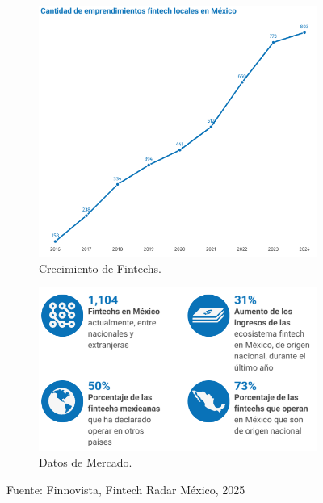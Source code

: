 \begin{figure}[h!]
    \centering
    \begin{subfigure}[b]{0.45\textwidth} %
        \centering
        \includegraphics[scale=0.5]{Figuras/crecimientofintec.png} %
        \caption{Crecimiento de Fintechs.}
        \label{fig:crecfintechs}
    \end{subfigure}
    \hspace{0.005\textwidth} %
    \begin{subfigure}[b]{0.45\textwidth} %
        \centering
        \includegraphics[scale=0.5]{Figuras/datosmercado.png} %
        \caption{Datos de Mercado.}
        \label{fig:datmerca}
    \end{subfigure}
    \caption{Fuente: Finnovista,  Fintech Radar México, 2025}
    \label{fig:figure1}
\end{figure}

